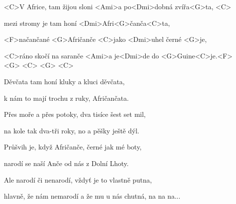 
\zs

<C>V Africe, tam žijou sloni <Ami>a po<Dmi>dobná 
zvířa<G>ta, <C>


mezi stromy je tam honí <Dmi>Afri<G>čanča<C>ta,


<F>načančané <G>Afričanče <C>jako <Dmi>uhel černé 
<G>je,


<C>ráno skočí na saranče <Ami>a je<Dmi>de do <G>Guine<C>je.<F> <G> <C> <G> <C> 

\ks
\zs

Děvčata tam honí kluky a kluci děvčata,

k nám to mají trochu z ruky, Afričančata.

Přes moře a přes potoky, dva tisíce šest set mil,

na kole tak dva-tři roky, no a pěšky ještě dýl.

\ks
\zs

Průšvih je, když Afričanče, černé jak mé boty,

narodí se naší Anče od nás z Dolní Lhoty.

Ale narodí či nenarodí, vždyť je to vlastně putna,

hlavně, že nám nemarodí a že mu u nás chutná, na na na...

\ks

\kp
